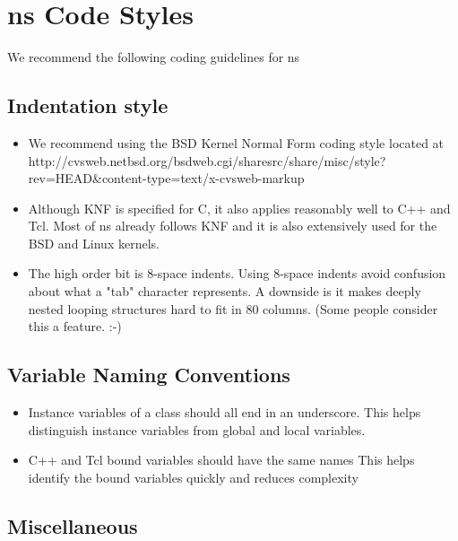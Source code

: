 \chapter{ns Code Styles}
\label{chap:codestyle}

We recommend the following coding guidelines for ns 

\section{Indentation style}
\label{sec:indentationstyle}

\begin{itemize}
\item We recommend using the BSD Kernel Normal Form coding style located at\\
http://cvsweb.netbsd.org/bsdweb.cgi/sharesrc/share/misc/style?rev=HEAD\&content-type=text/x-cvsweb-markup

\item Although KNF is specified for C, it also applies reasonably well to C++ and Tcl.
Most of ns already follows KNF and it is also extensively used for the BSD and
Linux kernels.

\item The high order bit is 8-space indents.
Using 8-space indents avoid confusion about what a "tab" character
represents.  A downside is it makes deeply nested looping structures
hard to fit in 80 columns.  (Some people consider this a feature. :-)
\end{itemize}


\section{Variable Naming Conventions}
\label{sec:variablenamingconventions}

\begin{itemize}
\item Instance variables of a class should all end in an underscore.
This helps distinguish instance variables from global and local
variables.

\item C++ and Tcl bound variables should have the same names
This helps identify the bound variables quickly and reduces complexity
\end{itemize}


\section{Miscellaneous}
\label{sec:miscellaneous}

